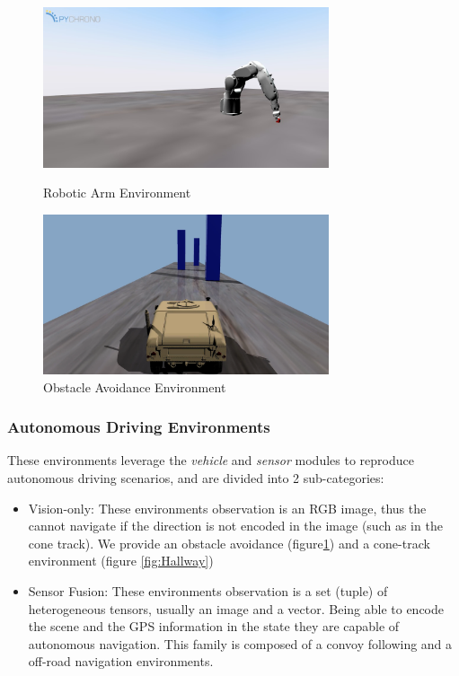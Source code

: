 \documentclass{svproc}
\begin{document}
\begin{figure}[ht]
 \begin{minipage}[b]{0.6\linewidth}
    \centering
    \includegraphics[width=0.75\textwidth]{Figures/Comau.jpg}
    \caption{Robotic Arm Environment}
    \label{fig:Comau}
 \end{minipage}
 \begin{minipage}[b]{0.6\linewidth}
    \centering
    \includegraphics[width=0.75\textwidth]{Figures/obst_aovid.png}
    \caption{Obstacle Avoidance Environment}
    \label{fig:Obst_avoid}
 \end{minipage}
\end{figure}

\subsubsection{Autonomous Driving Environments}
These environments leverage the \textit{vehicle} and \textit{sensor} modules to reproduce autonomous driving scenarios, and are divided into 2 sub-categories:
\begin{itemize}
    \item Vision-only: \newline
    These environments observation is an RGB image, thus the cannot navigate if the direction is not encoded in the image (such as in the cone track). We provide an obstacle avoidance (figure\ref{fig:Obst_avoid}) and a cone-track environment (figure \ref{fig:Hallway})
    \item Sensor Fusion: \newline
    These environments observation is a set (tuple) of heterogeneous tensors, usually an image and a vector. Being able to encode the scene and the GPS information in the state they are capable of autonomous navigation. This family is composed of a convoy following and a off-road navigation environments.
\end{itemize}
\end{document}

